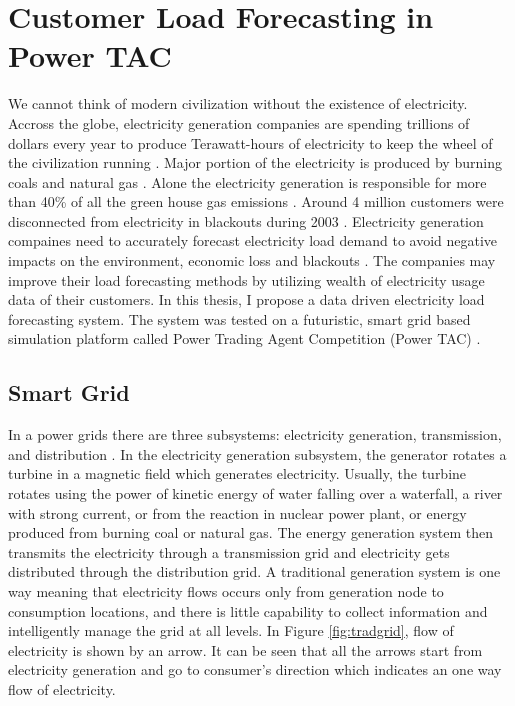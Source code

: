 
\chapter{Customer Load Forecasting in Power TAC}

We cannot think of modern civilization without the existence of electricity. Accross the globe, electricity generation companies are spending trillions of dollars every year to produce Terawatt-hours of electricity to keep the wheel of the civilization running \cite{electricityStats}. Major portion of the electricity is produced by burning coals and natural gas \cite{electricityStats}. Alone the electricity generation is responsible for more than 40\% of all the green house gas emissions \cite{schreiber2009environmental}. Around 4 million customers were disconnected from electricity in blackouts during 2003 \cite{andersson2005causes}. Electricity generation compaines need to accurately forecast electricity load demand to avoid negative impacts on the environment, economic loss and blackouts \cite{lodhi2013impact, sanghvi1982economic}. The companies may improve their load forecasting methods by utilizing wealth of electricity usage data of their customers. In this thesis, I propose a data driven electricity load forecasting system. The system was tested on a futuristic, smart grid \cite{fang2012smart} based simulation platform called Power Trading Agent Competition (Power TAC) \cite{ketter2013power}.

\section{Smart Grid}

In a power grids there are three subsystems: electricity generation, transmission, and distribution \cite{fang2012smart}. In the electricity generation subsystem, the generator rotates a turbine in a magnetic field which generates electricity. Usually, the turbine rotates using the power of kinetic energy of water falling over a waterfall, a river with strong current, or from the reaction in nuclear power plant, or energy produced from burning coal or natural gas. The energy generation system then transmits the electricity through a transmission grid and electricity gets distributed through the distribution grid. A traditional generation system is one way meaning that electricity flows occurs only from generation node to consumption locations, and there is little capability to collect information and intelligently manage the grid at all levels. In Figure \ref{fig:tradgrid}, flow of electricity is shown by an arrow. It can be seen that all the arrows start from electricity generation and go to consumer's direction which indicates an one way flow of electricity.

